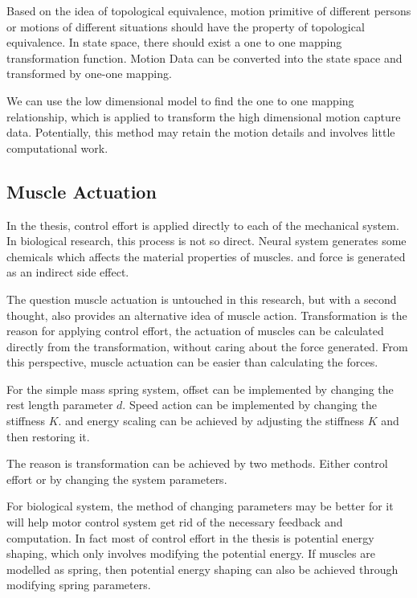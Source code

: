 Based on the idea of topological equivalence, 
motion primitive of different persons or motions of different situations should have the property of topological equivalence.
In state space, there should exist a one to one mapping transformation function.
Motion Data can be converted into the state space and  transformed by one-one mapping.


We can use the low dimensional model to find the one to one mapping relationship, 
which is applied to transform the high dimensional motion capture data.
Potentially, this method may retain the motion details and involves little computational work. 





\subsection{Muscle Actuation}
In the thesis, control effort is applied directly to each \dof of the mechanical system.
In biological research, this process is not so direct.
Neural system generates some chemicals which affects the material properties of muscles.
and force is generated as an indirect side effect.


The question muscle actuation is untouched in this research,
but with a second thought, \moit also provides an alternative idea of muscle action.
Transformation is the reason for applying control effort,
the actuation of muscles can be calculated directly from the transformation, without caring about the force generated.
From this perspective, muscle actuation can be easier than calculating the forces.


For the simple  mass spring system,
offset can be implemented by changing the rest length parameter $d$.
Speed action can be implemented by changing the stiffness $K$.
and energy scaling can be achieved by adjusting the stiffness $K$ and then restoring it.
 

The reason is transformation can be achieved by two methods.
Either control effort or by changing the system parameters.

For biological system, the method of changing parameters  may be better for it will help motor control system get rid of the necessary feedback and computation. 
In fact most of control effort in the thesis is potential energy shaping, which only involves  modifying the potential energy.
If muscles are modelled as spring, then potential energy shaping can also be achieved through modifying spring parameters.

